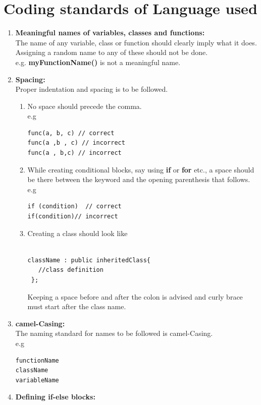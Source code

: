 \section{Coding standards of Language used} %
\label{sec:coding_standards_of_language_used}

\begin{enumerate}
\item \textbf{Meaningful names of variables, classes and functions:} \\
The name of any variable, class or function should clearly imply what it does. Assigning a random name to any of these should not be done.\\
e.g. \textbf{myFunctionName()} is not a meaningful name.
\item \textbf{Spacing:}\\
Proper indentation and spacing is to be followed. 
\begin{enumerate}
\item No space should precede the comma.\\
e.g
\begin{verbatim}
func(a, b, c) // correct 
func(a ,b , c) // incorrect 
func(a , b,c) // incorrect
\end{verbatim}
\item While creating conditional blocks, say using \textbf{if} or \textbf{for} etc., a space should be there between the keyword and the opening parenthesis that follows.\\
e.g
\begin{verbatim}
if (condition)  // correct  
if(condition)// incorrect
\end{verbatim}
\item Creating a class should look like\\\\
\begin{verbatim}
className : public inheritedClass{
   //class definition
 };
\end{verbatim}
Keeping a space before and after the colon is advised and curly brace must start after the class name.
\end{enumerate}
\item \textbf{camel-Casing:}\\
The naming standard for names to be followed is camel-Casing.\\
e.g
\begin{verbatim}
functionName     
className  
variableName 
\end{verbatim}
\item \textbf{Defining if-else blocks:}\\

\end{enumerate}
